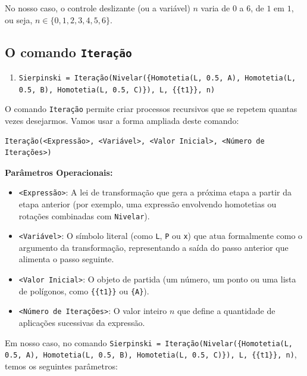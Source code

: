 \documentclass[12pt,a4paper]{report}
\begin{document}
	No nosso caso, o controle deslizante (ou a variável) $n$ varia de $0$ a $6$, de $1$ em $1$, ou seja, $n \in \{0, 1, 2, 3, 4, 5, 6\}$.
	
	\subsection{O comando \texttt{Iteração}}
	
	\begin{enumerate}[resume]
		\item \texttt{Sierpinski = Iteração(Nivelar(\{Homotetia(L, 0.5, A), Homotetia(L, 0.5, B), 
				Homotetia(L, 0.5, C)\}), L, \{\{t1\}\}, n)}
	\end{enumerate}
	
	O comando \texttt{Iteração} permite criar processos recursivos que se repetem quantas vezes desejarmos. Vamos usar a forma ampliada deste comando:
	
	\begin{destaque}
		\begin{verbatim}
Iteração(<Expressão>, <Variável>, <Valor Inicial>, <Número de Iterações>)
		\end{verbatim}
		
		\textbf{Parâmetros Operacionais:}
		\begin{itemize}
			\item \texttt{<Expressão>}: A lei de transformação que gera a próxima etapa a partir da etapa anterior (por exemplo, uma expressão envolvendo homotetias ou rotações combinadas com \texttt{Nivelar}).
			\item \texttt{<Variável>}: O símbolo literal (como \texttt{L}, \texttt{P} ou \texttt{x}) que atua formalmente como o argumento da transformação, representando a saída do passo anterior que alimenta o passo seguinte.
			\item \texttt{<Valor Inicial>}: O objeto de partida (um número, um ponto ou uma lista de polígonos, como \texttt{\{\{t1\}\}} ou \texttt{\{A\}}).
			\item \texttt{<Número de Iterações>}: O valor inteiro $n$ que define a quantidade de aplicações sucessivas da expressão.
		\end{itemize}
	\end{destaque}
	
	Em nosso caso, no comando \texttt{Sierpinski = Iteração(Nivelar(\{Homotetia(L, 0.5, A), Homotetia(L, 0.5, B), Homotetia(L, 0.5, C)\}), L, \{\{t1\}\}, n)}, temos os seguintes parâmetros:
	
\end{document}
